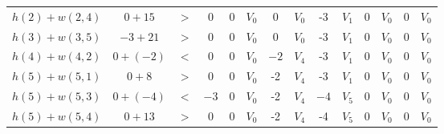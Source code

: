 \documentclass[../tp2_grupo404.tex]{subfiles}
\begin{document}
\begin{table}[H]
\begin{tabular}{@{}cccccccccccccc@{}}
    $h(2)+w(2,4)$ & $0+15$                          & $>$                        & 0                           & 0 & $V_0$ & 0                           & $V_0$                        & -3                          & $V_1$                               & 0 & $V_0$ & 0 & $V_0$ \\
    $h(3)+w(3,5)$ & $-3+21$                         & $>$                        & 0                           & 0 & $V_0$ & 0                           & $V_0$                        & -3                          & $V_1$                               & 0 & $V_0$ & 0 & $V_0$ \\
    $h(4)+w(4,2)$ & {\color[HTML]{9A0000} $0+(-2)$} & {\color[HTML]{9A0000} $<$} & {\color[HTML]{9A0000} $0$}  & 0 & $V_0$ & {\color[HTML]{9A0000} $-2$} & {\color[HTML]{9A0000} $V_4$} & -3                          & $V_1$                               & 0 & $V_0$ & 0 & $V_0$ \\
    $h(5)+w(5,1)$ & $0+8$                           & $>$                        & 0                           & 0 & $V_0$ & -2                          & $V_4$                        & -3                          & $V_1$                               & 0 & $V_0$ & 0 & $V_0$ \\
    $h(5)+w(5,3)$ & {\color[HTML]{9A0000} $0+(-4)$} & {\color[HTML]{9A0000} $<$} & {\color[HTML]{9A0000} $-3$} & 0 & $V_0$ & -2                          & $V_4$                        & {\color[HTML]{9A0000} $-4$} & {\color[HTML]{9A0000} $V_5$}        & 0 & $V_0$ & 0 & $V_0$ \\
    $h(5)+w(5,4)$ & $0+13$                          & $>$                        & 0                           & 0 & $V_0$ & -2                          & $V_4$                        & -4                          & $V_5$                               & 0 & $V_0$ & 0 & $V_0$ \\ \bottomrule
    \end{tabular}
    \label{Tab:EjFord1}
\end{table}
\end{document}
